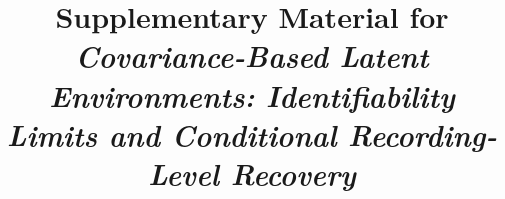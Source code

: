 \documentclass[preprint,12pt]{elsarticle}
\begin{document}
\begin{frontmatter}
\title{Supplementary Material for \\
\emph{Covariance-Based Latent Environments: Identifiability Limits and Conditional Recording-Level Recovery}}
\end{frontmatter}
\linenumbers




\end{document}
